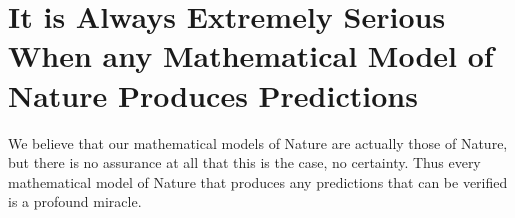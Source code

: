 \documentclass{amsart}
\begin{document}
\section{It is Always Extremely Serious When any Mathematical Model of Nature Produces Predictions}

We believe that our mathematical models of Nature are actually those of Nature, but there is no assurance at all that this is the case, no certainty.  Thus every mathematical model of Nature that produces any predictions that can be verified is a profound miracle.  
\end{document}
